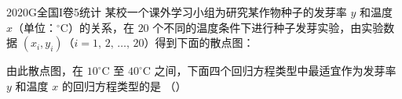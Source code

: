 
\begin{problem}{2020}{G}{全国I卷}{5}{统计}
某校一个课外学习小组为研究某作物种子的发芽率 $ y $ 和温度 $ x $（单位：$ ^\circ\text{C} $）的关系，在 $ 20 $ 个不同的温度条件下进行种子发芽实验，由实验数据 $ (x_i, y_i) $（$ i = 1,\, 2,\, \dotsc,\, 20 $）得到下面的散点图：



由此散点图，在 $ 10^\circ\text{C} $ 至 $ 40^\circ\text{C} $ 之间，下面四个回归方程类型中最适宜作为发芽率 $ y $ 和温度 $ x $ 的回归方程类型的是 （\hspace{1cm}）
\begin{choices}
\end{choices}
\end{problem}

\begin{answer}

\end{answer}

\begin{solutions}

\end{solutions}